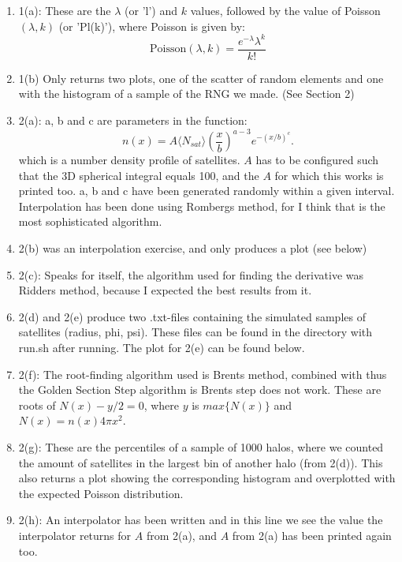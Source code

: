 \documentclass[10pt]{article}
\renewcommand{\l}{\lambda}
\begin{document}
\begin{enumerate}[-]

\item 1(a): These are the $\lambda$ (or 'l') and $k$ values, followed by the value of Poisson$(\l,k)$ (or 'Pl(k)'), where Poisson is given by:
$$\text{Poisson}(\l,k)=\dfrac{e^{-\l}\l^k}{k!}$$

\item 1(b) Only returns two plots, one of the scatter of random elements and one with the histogram of a sample of the RNG we made. (See Section 2)

\item 2(a): a, b and c are parameters in the function:
$$n(x)=A\langle N_{sat}\rangle \left(\dfrac{x}{b}\right)^{a-3}e^{-(x/b)^c}.$$
which is a number density profile of satellites. $A$ has to be configured such that the 3D spherical integral equals 100, and the $A$ for which this works is printed too. a, b and c have been generated randomly within a given interval. Interpolation has been done using Rombergs method, for I think that is the most sophisticated algorithm.

\item 2(b) was an interpolation exercise, and only produces a plot (see below)

\item 2(c): Speaks for itself, the algorithm used for finding the derivative was Ridders method, because I expected the best results from it.

\item 2(d) and 2(e) produce two .txt-files containing the simulated samples of satellites (radius, phi, psi). These files can be found in the directory with run.sh after running. The plot for 2(e) can be found below.

\item 2(f): The root-finding algorithm used is Brents method, combined with thus the Golden Section Step algorithm is Brents step does not work. These are roots of $N(x)-y/2=0$, where $y$ is $max\{N(x)\}$ and $N(x)=n(x)4\pi x^2$.

\item 2(g): These are the percentiles of a sample of 1000 halos, where we counted the amount of satellites in the largest bin of another halo (from 2(d)). This also returns a plot showing the corresponding histogram and overplotted with the expected Poisson distribution.

\item 2(h): An interpolator has been written and in this line we see the value the interpolator returns for $A$ from 2(a), and $A$ from 2(a) has been printed again too.

\end{enumerate}
\end{document}
